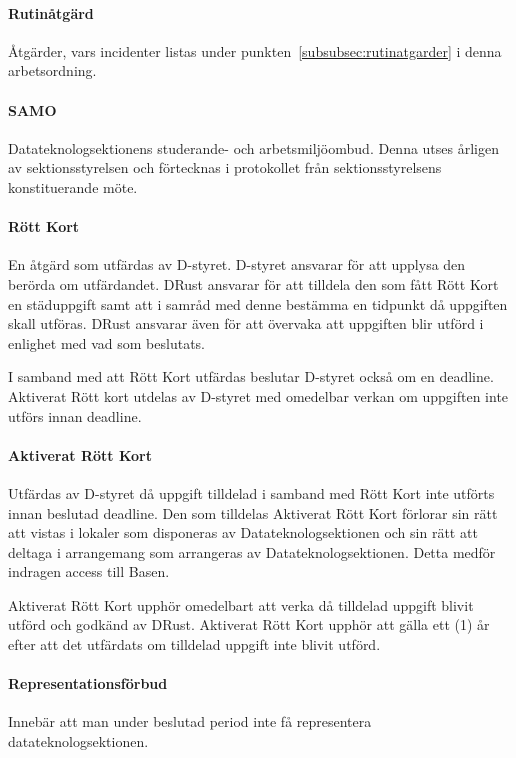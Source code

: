 \documentclass{dtek}
\begin{document}
\paragraph{Rutinåtgärd}
Åtgärder, vars incidenter listas under punkten~\ref{subsubsec:rutinatgarder} i
denna arbetsordning.

\paragraph{SAMO}
Datateknologsektionens studerande- och arbetsmiljöombud. Denna utses årligen av
sektionsstyrelsen och förtecknas i protokollet från sektionsstyrelsens
konstituerande möte.

\paragraph{Rött Kort}
En åtgärd som utfärdas av D-styret. D-styret ansvarar för att upplysa den
berörda om utfärdandet. DRust ansvarar för att tilldela den som fått Rött Kort
en städuppgift samt att i samråd med denne bestämma en tidpunkt då uppgiften
skall utföras. DRust ansvarar även för att övervaka att uppgiften blir utförd i
enlighet med vad som beslutats.

I samband med att Rött Kort utfärdas beslutar D-styret också om en deadline.
Aktiverat Rött kort utdelas av D-styret med omedelbar verkan om uppgiften inte
utförs innan deadline.

\paragraph{Aktiverat Rött Kort}
Utfärdas av D-styret då uppgift tilldelad i samband med Rött Kort inte utförts
innan beslutad deadline. Den som tilldelas Aktiverat Rött Kort förlorar sin
rätt att vistas i lokaler som disponeras av Datateknologsektionen och sin rätt
att deltaga i arrangemang som arrangeras av Datateknologsektionen. Detta medför
indragen access till Basen.

Aktiverat Rött Kort upphör omedelbart att verka då tilldelad uppgift blivit
utförd och godkänd av DRust. Aktiverat Rött Kort upphör att gälla ett (1) år
efter att det utfärdats om tilldelad uppgift inte blivit utförd.

\paragraph{Representationsförbud}
Innebär att man under beslutad period inte få representera datateknologsektionen. 
\end{document}
